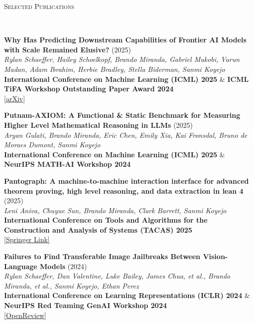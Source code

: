 \documentclass{article}
\newenvironment{changemargin}[2]{%
  \begin{list}{}{%
    \setlength{\topsep}{0pt}%
    \setlength{\leftmargin}{#1}%
    \setlength{\rightmargin}{#2}%
    \setlength{\listparindent}{\parindent}%
    \setlength{\itemindent}{\parindent}%
    \setlength{\parsep}{\parskip}%
  }%
  \item[]}{\end{list}
}
\newcommand{\lineover}{
	\begin{changemargin}{-0.05in}{-0.05in}
		\vspace*{-8pt}
		\hrulefill \\
		\vspace*{-2pt}
	\end{changemargin}
}
\newcommand{\header}[1]{
	\begin{changemargin}{-0.5in}{-0.5in}
		\scshape{#1}\\
  	\lineover
	\end{changemargin}
}
\newenvironment{body} {
	\vspace*{-16pt}
	\begin{changemargin}{-0.25in}{-0.5in}
  }	
	{\end{changemargin}
}
\begin{document}
\header{Selected Publications}
\begin{body}
    \vspace{4pt} %
    
    \vspace{10pt}
    \textbf{Why Has Predicting Downstream Capabilities of Frontier AI Models with Scale Remained Elusive?} (2025)\\
    \emph{Rylan Schaeffer, Hailey Schoelkopf, Brando Miranda, Gabriel Mukobi, Varun Madan, Adam Ibrahim, Herbie Bradley, Stella Biderman, Sanmi Koyejo}\\
    \textbf{International Conference on Machine Learning (ICML) 2025} \& \textbf{ICML TiFA Workshop Outstanding Paper Award 2024}\\
    \href{https://arxiv.org/pdf/2406.04391}{[arXiv]}

    \vspace{10pt}
    \textbf{Putnam-AXIOM: A Functional \& Static Benchmark for Measuring Higher Level Mathematical Reasoning in LLMs} (2025)\\
    \emph{Aryan Gulati, Brando Miranda, Eric Chen, Emily Xia, Kai Fronsdal, Bruno de Moraes Dumont, Sanmi Koyejo}\\
    \textbf{International Conference on Machine Learning (ICML) 2025} \& \textbf{NeurIPS MATH-AI Workshop 2024}
    
    \vspace{10pt}
    \textbf{Pantograph: A machine-to-machine interaction interface for advanced theorem proving, high level reasoning, and data extraction in lean 4} (2025)\\
    \emph{Leni Aniva, Chuyue Sun, Brando Miranda, Clark Barrett, Sanmi Koyejo}\\
    \textbf{International Conference on Tools and Algorithms for the Construction and Analysis of Systems (TACAS) 2025}\\
    \href{https://link.springer.com/chapter/10.1007/978-3-031-90643-5_6}{[Springer Link]}
    
    \vspace{10pt}
    \textbf{Failures to Find Transferable Image Jailbreaks Between Vision-Language Models} (2024)\\
    \emph{Rylan Schaeffer, Dan Valentine, Luke Bailey, James Chua, et al., Brando Miranda, et al., Sanmi Koyejo, Ethan Perez}\\
    \textbf{International Conference on Learning Representations (ICLR) 2024} \& \textbf{NeurIPS Red Teaming GenAI Workshop 2024}\\
    \href{https://openreview.net/forum?id=wvFnqVVUhN}{[OpenReview]}
    

\end{body}
\end{document}
